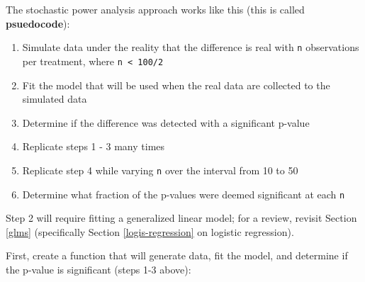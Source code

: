 \documentclass[]{book}
\providecommand{\tightlist}{%
  \setlength{\itemsep}{0pt}\setlength{\parskip}{0pt}}
\begin{document}
The stochastic power analysis approach works like this (this is called \textbf{psuedocode}):

\begin{enumerate}
\def\labelenumi{\arabic{enumi}.}
\tightlist
\item
  Simulate data under the reality that the difference is real with \texttt{n} observations per treatment, where \texttt{n\ \textless{}\ 100/2}
\item
  Fit the model that will be used when the real data are collected to the simulated data
\item
  Determine if the difference was detected with a significant p-value
\item
  Replicate steps 1 - 3 many times
\item
  Replicate step 4 while varying \texttt{n} over the interval from 10 to 50
\item
  Determine what fraction of the p-values were deemed significant at each \texttt{n}
\end{enumerate}

Step 2 will require fitting a generalized linear model; for a review, revisit Section \ref{glms} (specifically Section \ref{logis-regression} on logistic regression).

First, create a function that will generate data, fit the model, and determine if the p-value is significant (steps 1-3 above):
\end{document}
